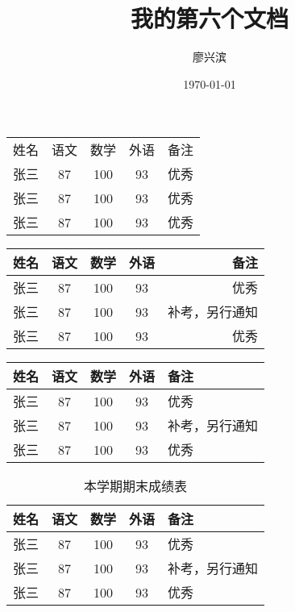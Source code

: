 \documentclass{article} %
\title{\heiti 我的第六个文档}
\author{\kaishu 廖兴滨}
\date{\today}
\begin{document}
	\maketitle
	\begin{tabular}{l c c c r}
		姓名 & 语文 & 数学 & 外语 & 备注 \\
		张三 & 87 & 100 & 93 & 优秀 \\
		张三 & 87 & 100 & 93 & 优秀 \\
		张三 & 87 & 100 & 93 & 优秀 \\
	\end{tabular}
	
	\begin{tabular}{|| l || c || c || c || r ||}
		\hline \hline
		姓名 & 语文 & 数学 & 外语 & 备注 \\
		\hline \hline
		张三 & 87 & 100 & 93 & 优秀 \\
		\hline \hline
		张三 & 87 & 100 & 93 & 补考，另行通知 \\
		\hline \hline
		张三 & 87 & 100 & 93 & 优秀 \\
		\hline \hline
	\end{tabular}


	\begin{tabular}{| l | c | c | c | p{1.5cm} |} %
		\hline 
		姓名 & 语文 & 数学 & 外语 & 备注 \\
		\hline 
		张三 & 87 & 100 & 93 & 优秀 \\
		\hline 
		张三 & 87 & 100 & 93 & 补考，另行通知 \\
		\hline 
		张三 & 87 & 100 & 93 & 优秀 \\
		\hline 
	\end{tabular}
	\begin{table}[H]
		\caption{本学期期末成绩表}
		\label{tab1}
		\centering
		\begin{tabular}{| l | c | c | c | p{2.5cm} |} %
			\hline 
			姓名 & 语文 & 数学 & 外语 & 备注 \\
			\hline 
			张三 & 87 & 100 & 93 & 优秀 \\
			\hline 
			张三 & 87 & 100 & 93 & 补考，另行通知 \\
			\hline 
			张三 & 87 & 100 & 93 & 优秀 \\
			\hline 
		\end{tabular}
	\end{table}
\end{document}
